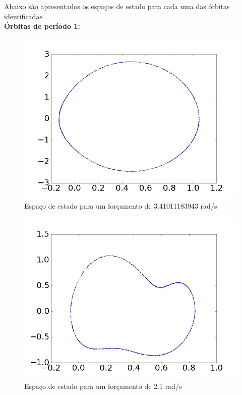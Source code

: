 
Abaixo são apresentados os espaços de estado para cada uma das órbitas identificadas
\\

\textbf{Órbitas de período 1:}

\begin{figure}[!ht]
	\centering
	\includegraphics[scale=0.35]{OPI_identification/state_space4,1.jpg}
	\caption{Espaço de estado para um forçamento de 3.41011183943 rad/s}
	\label{state_space_4.1rad/s}
\end{figure}

\begin{figure}[!ht]
	\centering
	\includegraphics[scale=0.35]{OPI_identification/state_space2,1.jpg}
	\caption{Espaço de estado para um forçamento de 2.1 rad/s}
	\label{state_space_2.1rad/s}
\end{figure}
\hspace{1mm}

